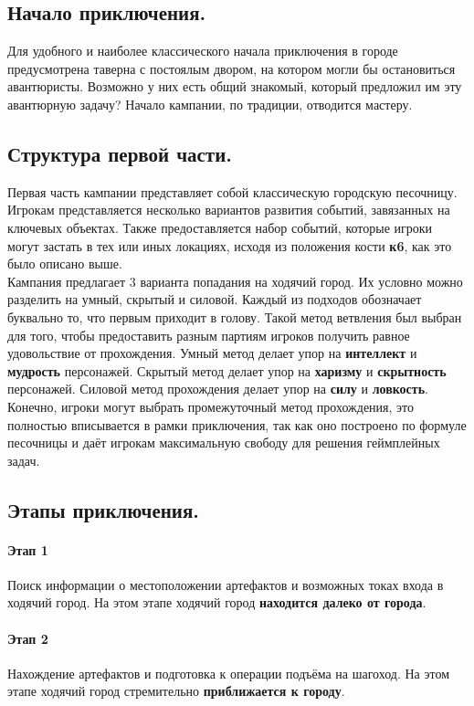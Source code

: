 \documentclass[a4paper,12pt,twoside,twocolumn]{book}
\begin{document}
\subsection{Начало приключения.}
Для удобного и наиболее классического начала приключения в городе предусмотрена таверна с постоялым двором, на котором могли бы остановиться авантюристы. Возможно у них есть 
общий знакомый, который предложил им эту авантюрную задачу? Начало кампании, по традиции, отводится мастеру.
\subsection{Структура первой части.}
Первая часть кампании представляет собой классическую городскую песочницу. Игрокам представляется несколько вариантов развития событий, завязанных на ключевых объектах. Также 
предоставляется набор событий, которые игроки могут застать в тех или иных локациях, исходя из положения кости \textbf{к6}, как это было описано выше. 
\\Кампания предлагает 3 варианта попадания на ходячий город. Их условно можно разделить на умный, скрытый и силовой. Каждый из подходов обозначает буквально то, что первым 
приходит в голову. Такой метод ветвления был выбран для того, чтобы предоставить разным партиям игроков получить равное удовольствие от прохождения. Умный метод делает упор 
на \textbf{интеллект} и \textbf{мудрость} персонажей. Скрытый метод делает упор на \textbf{харизму} и \textbf{скрытность} персонажей. Силовой метод прохождения делает упор 
на \textbf{силу} и \textbf{ловкость}. Конечно, игроки могут выбрать промежуточный метод прохождения, это полностью вписывается в рамки приключения, так как оно построено по 
формуле песочницы и даёт игрокам максимальную свободу для решения геймплейных задач.
\subsection{Этапы приключения.}
\paragraph{Этап 1}
Поиск информации о местоположении артефактов и возможных токах входа в ходячий город. На этом этапе ходячий город \textbf{находится далеко от города}. 
\paragraph{Этап 2}
Нахождение артефактов и подготовка к операции подъёма на шагоход. На этом этапе ходячий город стремительно \textbf{приближается к городу}.
\end{document}
